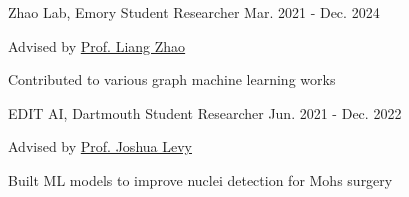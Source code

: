 \begin{cventries}
 \vspace{3mm}

 \cventry
    {Zhao Lab, Emory} %
    {Student Researcher} %
    {} %
    {Mar. 2021 - Dec. 2024} %
    {
      \begin{cvitems} %
        \item Advised by \href{https://cs.emory.edu/~lzhao41/}{Prof. Liang Zhao}
        \item Contributed to various graph machine learning works
      \end{cvitems}
    }
    
 \vspace{3mm}
 
 \cventry
    {EDIT AI, Dartmouth} %
    {Student Researcher} %
    {} %
    {Jun. 2021 - Dec. 2022} %
    {
      \begin{cvitems} %
        \item Advised by \href{https://jlevy44.github.io/levylab/}{Prof. Joshua Levy}
        \item Built ML models to improve nuclei detection for Mohs surgery
      \end{cvitems}
    }


\end{cventries}
